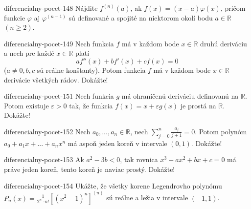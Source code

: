 \begin{defproblem}{diferencialny-pocet-148}
Nájdite $f^{(n)}(a)$, ak $f(x)=(x-a)\varphi (x)$, pričom funkcie $\varphi$ aj $\varphi^{(n-1)}$ sú definované a spojité na niektorom okolí bodu $a\in\mathbb{R}$ $(n\geq 2)$.
\end{defproblem}

\begin{defproblem}{diferencialny-pocet-149}
Nech funkcia $f$ má v každom bode $x\in\mathbb{R}$ druhú deriváciu a nech pre každé $x\in\mathbb{R}$ platí 
$$af''(x)+bf'(x)+cf(x)=0$$
($a\neq 0,b,c$ sú reálne konštanty). Potom funkcia $f$ má v každom bode $x\in\mathbb{R}$ derivácie všetkých rádov. Dokážte!
\end{defproblem}


\begin{defproblem}{diferencialny-pocet-151}
Nech funkcia $g$ má ohraničenú deriváciu definovanú na $\mathbb{R}$. Potom existuje $\varepsilon >0$ tak, že funkcia $f(x)=x+\varepsilon g(x)$ je prostá na $\mathbb{R}$. Dokážte!
\end{defproblem}

\begin{defproblem}{diferencialny-pocet-152}
Nech $a_0,...,a_n\in\mathbb{R}$, nech $\sum_{j=0}^n\frac{a_j}{j+1}=0$. Potom polynóm $a_0+a_1x+...+a_nx^n$ má aspoň jeden koreň v intervale $(0,1)$. Dokážte!
\end{defproblem}

\begin{defproblem}{diferencialny-pocet-153}
Ak $a^2-3b<0$, tak rovnica $x^3+ax^2+bx+c=0$ má práve jeden koreň, tento koreň je naviac prostý. Dokážte!
\end{defproblem}

\begin{defproblem}{diferencialny-pocet-154}
Ukážte, že všetky korene Legendrovho polynómu $P_n(x)=\frac{1}{2^n\cdot n!}[(x^2-1)^n]^{(n)}$ sú reálne a ležia v intervale $(-1,1)$.
\end{defproblem}

